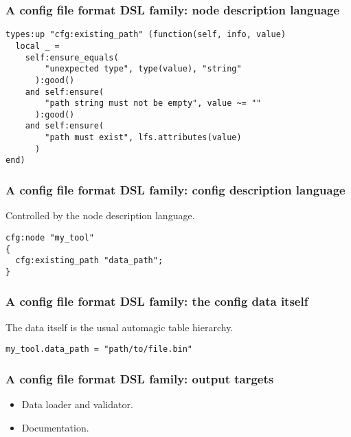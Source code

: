 \documentclass[handout]{beamer}
\begin{document}

\begin{frame}[fragile]

\frametitle{A config file format DSL family: node description language}

\begin{verbatim}
types:up "cfg:existing_path" (function(self, info, value)
  local _ =
    self:ensure_equals(
        "unexpected type", type(value), "string"
      ):good()
    and self:ensure(
        "path string must not be empty", value ~= ""
      ):good()
    and self:ensure(
        "path must exist", lfs.attributes(value)
      )
end)
\end{verbatim}

\end{frame}


\begin{frame}[fragile]

\frametitle{A config file format DSL family: config description language}

Controlled by the node description language.

\begin{verbatim}
cfg:node "my_tool"
{
  cfg:existing_path "data_path";
}
\end{verbatim}

\end{frame}


\begin{frame}[fragile]

\frametitle{A config file format DSL family: the config data itself}

The data itself is the usual automagic table hierarchy.

\begin{verbatim}
my_tool.data_path = "path/to/file.bin"
\end{verbatim}

\end{frame}


\begin{frame}

\frametitle{A config file format DSL family: output targets}

\begin{itemize}
\item Data loader and validator.
\item Documentation.
\end{itemize}

\end{frame}
\end{document}
